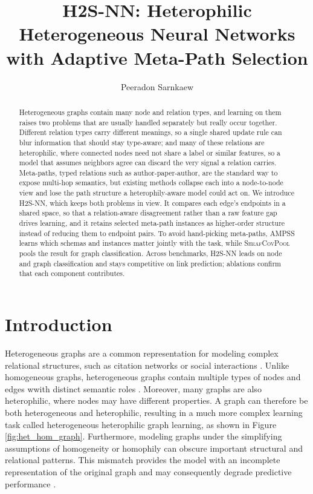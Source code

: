 \documentclass[sigconf,anonymous,review]{acmart}
\title[H2S-NN]{H2S-NN: Heterophilic Heterogeneous Neural Networks with Adaptive Meta-Path Selection}
\author{Peeradon Sarnkaew}
\affiliation{%
  \institution{Independent Researcher}
  \city{Bangkok}
  \country{Thailand}
}
\newcommand{\method}{\textsc{H2S-NN}}
\newcommand{\ampss}{\textsc{AMPSS}}
\newcommand{\sheafcovpool}{\textsc{SheafCovPool}}
\begin{document}
\begin{abstract}
Heterogeneous graphs contain many node and relation types, and learning on them raises two problems that are usually handled separately but really occur together. Different relation types carry different meanings, so a single shared update rule can blur information that should stay type-aware; and many of these relations are heterophilic, where connected nodes need not share a label or similar features, so a model that assumes neighbors agree can discard the very signal a relation carries. Meta-paths, typed relations such as author-paper-author, are the standard way to expose multi-hop semantics, but existing methods collapse each into a node-to-node view and lose the path structure a heterophily-aware model could act on. We introduce \method{}, which keeps both problems in view. It compares each edge's endpoints in a shared space, so that a relation-aware disagreement rather than a raw feature gap drives learning, and it retains selected meta-path instances as higher-order structure instead of reducing them to endpoint pairs. To avoid hand-picking meta-paths, \ampss{} learns which schemas and instances matter jointly with the task, while \sheafcovpool{} pools the result for graph classification. Across benchmarks, \method{} leads on node and graph classification and stays competitive on link prediction; ablations confirm that each component contributes.
\end{abstract}



\maketitle

\section{Introduction}
\label{sec:introduction}


Heterogeneous graphs are a common representation for modeling complex relational structures, such as citation 
networks \cite{liu2014meta} or social interactions \cite{singh2025overview}. Unlike homogeneous graphs, heterogeneous graphs contain multiple types of nodes and edges wwith distinct semantic roles \cite{sun2013mining}. Moreover, many graphs are also heterophilic, where nodes may have different properties. A graph can therefore be both heterogeneous and heterophilic, resulting in a much more complex learning task called heterogeneous heterophilic graph learning, as shown in Figure \ref{fig:het_hom_graph}. Furthermore, modeling graphs under the simplifying assumptions of homogeneity or homophily can obscure important structural and relational patterns. This mismatch provides the model with an incomplete representation of the original graph and may consequently degrade predictive performance \cite{lin2025heterophily}. 
\end{document}
